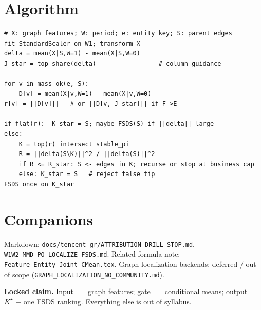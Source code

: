 \documentclass[11pt]{article}
\begin{document}
\section{Algorithm}
\label{sec:algo}

\begin{verbatim}
# X: graph features; W: period; e: entity key; S: parent edges
fit StandardScaler on W1; transform X
delta = mean(X|S,W=1) - mean(X|S,W=0)
J_star = top_share(delta)                 # column guidance

for v in mass_ok(e, S):
    D[v] = mean(X|v,W=1) - mean(X|v,W=0)
r[v] = ||D[v]||   # or ||D[v, J_star]|| if F->E

if flat(r):  K_star = S; maybe FSDS(S) if ||delta|| large
else:
    K = top(r) intersect stable_pi
    R = ||delta(S\K)||^2 / ||delta(S)||^2
    if R <= R_star: S <- edges in K; recurse or stop at business cap
    else: K_star = S   # reject false tip
FSDS once on K_star
\end{verbatim}

\section{Companions}
\label{sec:docs}

Markdown:
\texttt{docs/tencent\_gr/ATTRIBUTION\_DRILL\_STOP.md},
\texttt{W1W2\_MMD\_PO\_LOCALIZE\_FSDS.md}.
Related formula note:
\texttt{Feature\_Entity\_Joint\_CMean.tex}.
Graph-localization backends: deferred / out of scope
(\texttt{GRAPH\_LOCALIZATION\_NO\_COMMUNITY.md}).

\vspace{1em}
\noindent\textbf{Locked claim.}
Input $=$ graph features; gate $=$ conditional means; output $=$
$K^\star$ + one FSDS ranking. Everything else is out of syllabus.
\end{document}
